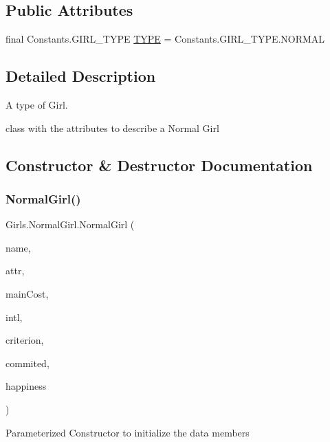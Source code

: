 \subsection*{Public Attributes}
\begin{DoxyCompactItemize}
\item 
final Constants.\+G\+I\+R\+L\+\_\+\+T\+Y\+PE \hyperlink{class_girls_1_1_normal_girl_af2c14c384ce0b17942c5bd3c8d96a128}{T\+Y\+PE} = Constants.\+G\+I\+R\+L\+\_\+\+T\+Y\+P\+E.\+N\+O\+R\+M\+AL
\end{DoxyCompactItemize}


\subsection{Detailed Description}
A type of Girl. 

class with the attributes to describe a Normal Girl 

\subsection{Constructor \& Destructor Documentation}
\mbox{\label{class_girls_1_1_normal_girl_ad7e9902b8001319fa9e0cec02195dc91}} 
\subsubsection{\texorpdfstring{Normal\+Girl()}{NormalGirl()}\hspace{0.1cm}{\footnotesize\ttfamily [1/2]}}
{\footnotesize\ttfamily Girls.\+Normal\+Girl.\+Normal\+Girl (\begin{DoxyParamCaption}\item[{String}]{name,  }\item[{int}]{attr,  }\item[{int}]{main\+Cost,  }\item[{int}]{intl,  }\item[{Constants.\+C\+R\+I\+T\+E\+R\+I\+ON}]{criterion,  }\item[{boolean}]{commited,  }\item[{double}]{happiness }\end{DoxyParamCaption})\hspace{0.3cm}{\ttfamily [inline]}}

Parameterized Constructor to initialize the data members \mbox{\label{class_girls_1_1_normal_girl_a4456c49bb42d059050b87df402be57e3}} 
